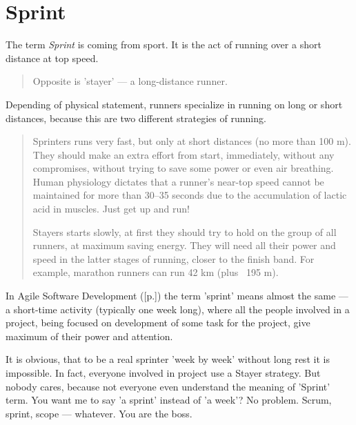 \section{Sprint}
\label{sec:Sprint}

The term \emph{Sprint} is coming from sport. It is the act of running over a short distance at top speed.

\begin{quote}
Opposite is 'stayer' — a long-distance runner.\end{quote} 

Depending of physical statement, runners specialize in running on long or short distances, because this are two different strategies of running.

\begin{quote}
Sprinters runs very fast, but only at short distances (no more than 100 m). They should make an extra effort from start, immediately, without any compromises, without trying to save some power or even air breathing. Human physiology dictates that a runner's near-top speed cannot be maintained for more than 30–35 seconds due to the accumulation of lactic acid in muscles. Just get up and run!

Stayers starts slowly, at first they should try to hold on the group of all runners, at maximum saving energy. They will need all their power and speed in the latter stages of running, closer to the finish band. For example, marathon runners can run 42 km (plus ~195 m).                                                                                                                                                                                                                                                   \end{quote} 

In Agile Software Development ([p.\pageref{sec:Agile Software Development}]) the term 'sprint' means almost the same — a short-time activity (typically one week long), where all the people involved in a project, being focused on development of some task for the project, give maximum of their power and attention.

It is obvious, that to be a real sprinter 'week by week' without long rest it is impossible. In fact, everyone involved in project use a Stayer strategy. But nobody cares, because not everyone even understand the meaning of 'Sprint' term. You want me to say 'a sprint' instead of 'a week'? No problem. Scrum, sprint, scope — whatever. You are the boss.
